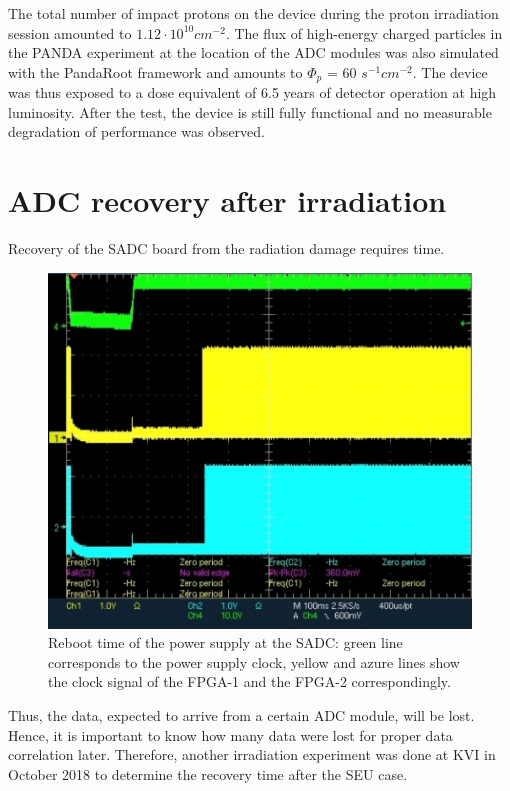 \documentclass[12pt,a4paper, twocolumn]{article}
\begin{document}
The total number of impact protons on the device during the proton irradiation session amounted to $1.12\cdot10^{10}cm^{-2}$.
The flux of high-energy charged particles in the PANDA experiment at the location of the ADC modules was also simulated with the PandaRoot framework \cite{kava2} and amounts to 
$\Phi_p$ = 60 $s^{-1}cm^{-2}$.
The device was thus exposed to a dose equivalent of 6.5 years of detector operation at high luminosity. After the test, the device is still fully functional and no measurable degradation of performance was observed. 
\section{ADC recovery after irradiation}
Recovery of the SADC board from the radiation damage requires time. 
\begin{figure}[htb]
\includegraphics[width=\linewidth, trim={0 0 0 0}, clip]{fig/PowerReboot.png}
\caption{\label{fig:sadc:pwr_rbt}Reboot time of the power supply at the SADC: green line corresponds to the power supply clock, yellow and azure lines show the clock signal of the FPGA-1 and the FPGA-2 correspondingly. }
\end{figure}Thus, the data, expected to arrive from a certain ADC module, will be lost. Hence, it is important to know how many data were lost for proper data correlation later. Therefore, another irradiation experiment was done at KVI in October 2018 to determine the recovery time after the SEU case.
\end{document}
